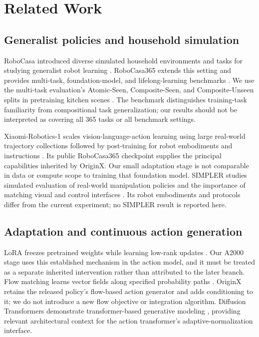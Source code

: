 \documentclass[10pt,twocolumn,letterpaper]{article}
\begin{document}
\section{Related Work}

\subsection{Generalist policies and household simulation}

RoboCasa introduced diverse simulated household environments and tasks for studying generalist robot learning \cite{r1}. RoboCasa365 extends this setting and provides multi-task, foundation-model, and lifelong-learning benchmarks \cite{r2}. We use the multi-task evaluation's Atomic-Seen, Composite-Seen, and Composite-Unseen splits in pretraining kitchen scenes \cite{r3}. The benchmark distinguishes training-task familiarity from compositional task generalization; our results should not be interpreted as covering all 365 tasks or all benchmark settings.


Xiaomi-Robotics-1 scales vision-language-action learning using large real-world trajectory collections followed by post-training for robot embodiments and instructions \cite{r4}. Its public RoboCasa365 checkpoint supplies the principal capabilities inherited by OriginX. Our small adaptation stage is not comparable in data or compute scope to training that foundation model. SIMPLER studies simulated evaluation of real-world manipulation policies and the importance of matching visual and control interfaces \cite{r8}. Its robot embodiments and protocols differ from the current experiment; no SIMPLER result is reported here.


\subsection{Adaptation and continuous action generation}

LoRA freezes pretrained weights while learning low-rank updates \cite{r5}. Our A2000 stage uses this established mechanism in the action model, and it must be treated as a separate inherited intervention rather than attributed to the later branch. Flow matching learns vector fields along specified probability paths \cite{r6}. OriginX retains the released policy's flow-based action generator and adds conditioning to it; we do not introduce a new flow objective or integration algorithm. Diffusion Transformers demonstrate transformer-based generative modeling \cite{r7}, providing relevant architectural context for the action transformer's adaptive-normalization interface.
\end{document}
